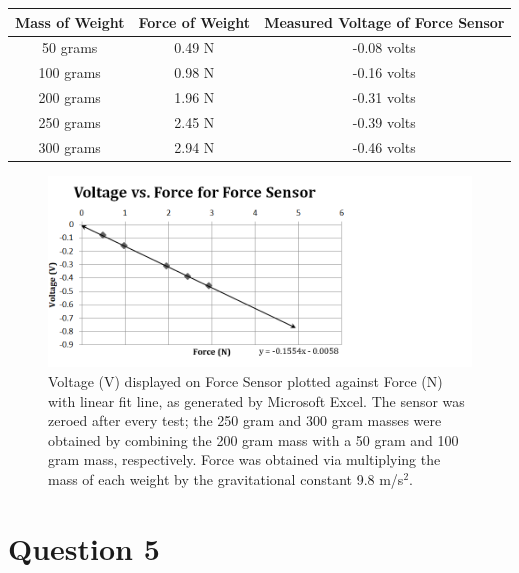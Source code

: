 \documentclass[titlepage]{article}
\begin{document}
\begin{table}[!htbp]
\renewcommand{\arraystretch}{1.3}
\centering
\begin{tabular}{c|c|c}
    \hline
    \hline
    Mass of Weight  &  Force of Weight  &  Measured Voltage of Force Sensor\\
    \hline
    \hline

    50 grams   &   0.49 N  &  -0.08 volts\\
    \hline

    100 grams    &   0.98 N  &  -0.16 volts\\
    \hline

    200 grams  &  1.96 N  &  -0.31 volts\\
    \hline

    250 grams  &  2.45 N  &  -0.39 volts\\
    \hline

    300 grams  &  2.94 N  &  -0.46 volts\\
    \hline
\end{tabular}
\end{table}

\begin{figure}[ht]
    \centering
    \includegraphics[width=6.0in]{LinReg.png}
    \caption{Voltage (V) displayed on Force Sensor plotted against Force (N) with linear fit line, as generated by Microsoft Excel. The sensor was zeroed after every test; the 250 gram and 300 gram masses were obtained by combining the 200 gram mass with a 50 gram and 100 gram mass, respectively. Force was obtained via multiplying the mass of each weight by the gravitational constant 9.8 m/{s}$^2$.}
    \label{fig:2}
\end{figure}

\clearpage

\section*{Question 5}
\end{document}
